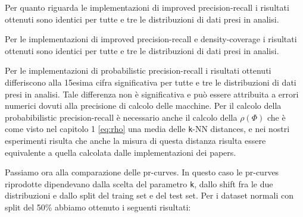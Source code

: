 Per quanto riguarda le implementazioni di improved precision-recall \cite{2ImprovedPrecisionRecall} i risultati ottenuti sono identici per tutte e tre le distribuzioni di dati presi in analisi.

Per le implementazioni di improved precision-recall e density-coverage \cite{3ReliableFidelityDiversityMetrics} i risultati ottenuti sono identici per tutte e tre le distribuzioni di dati presi in analisi.

Per le implementazioni di probabilistic precision-recall \cite{4ProbabilisticPrecisionRecall} i risultati ottenuti differiscono alla 15esima cifra significativa per tutte e tre le distribuzioni di dati presi in analisi.
Tale differenza non è significativa e può essere attribuita a errori numerici dovuti alla precisione di calcolo delle macchine. Per il calcolo della probabibilistic precision-recall è necessario anche il calcolo della \(\rho(\Phi)\) che è come visto nel capitolo 1 \ref{eq:rho} una media delle \texttt{k}-NN distances,
e nei nostri esperimenti risulta che anche la misura di questa distanza risulta essere equivalente a quella calcolata dalle implementazioni dei papers.

Passiamo ora alla comparazione delle pr-curves. In questo caso le pr-curves riprodotte dipendevano dalla scelta del parametro \texttt{k}, dallo shift fra le due distribuzioni e dallo split del traing set e del test set.
Per i dataset normali con split del 50\% abbiamo ottenuto i seguenti risultati:

